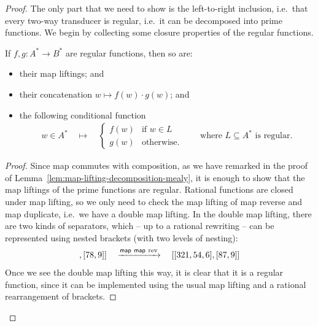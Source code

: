 \begin{proof}
    The only part that we need to show is the left-to-right inclusion, i.e.~that every two-way transducer is regular, i.e.~it can be decomposed into prime functions. We begin by collecting some closure properties of the regular functions.
    \begin{lemma}
        \label{lem:regular-closure-properties}
        If $f,g : A^* \to B^*$ are regular functions, then so are: 
        \begin{itemize}
            \item their map liftings; and
            \item their concatenation $w \mapsto f(w)\cdot g(w)$; and
            \item the following conditional function
            \begin{align*}
            w \in A^* \quad \mapsto \quad
            \begin{cases}
                f(w) & \text{if $w \in L$}\\
                g(w) & \text{otherwise.}
            \end{cases}
            \qquad \text{where $L \subseteq A^*$ is regular.}
            \end{align*}
        \end{itemize}
    \end{lemma}

    \begin{proof}
        Since map commutes with composition, as we have remarked in the proof of Lemma~\ref{lem:map-lifting-decomposition-mealy}, it is enough to show that the map liftings of the prime functions are regular. Rational functions are closed under map lifting, so we only need to check the map lifting of map reverse and map duplicate, i.e.~we have a double map lifting. In the double map lifting, there are two kinds of separators, which -- up to a rational rewriting -- can be represented using nested brackets (with two levels of nesting): 
        \begin{align*}
        [[123,45,6],[78,9]] \quad \xrightarrow{\map\  \map\  \text{rev}} \quad [[321,54,6],[87,9]]
        \end{align*}
        Once we see the double map lifting this way, it is clear that it is a regular function, since it can be implemented using the usual map lifting and a rational rearrangement of brackets.


\end{proof}
\end{proof}
